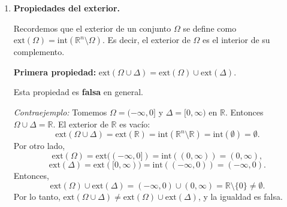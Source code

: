 \documentclass[12pt]{article}
\newcommand{\Ext}{\mathrm{ext}}
\newcommand{\Int}{\mathrm{int}}
\newcommand{\R}{\mathbb R}
\newcommand{\x}{\mathrm x}
\begin{document}
\begin{enumerate}
\begin{enumerate}[(1)]
\textit{Contraejemplo para la otra contención:} Tomemos $\Omega = [0,1]$ y $\Delta = [1,2]$ en $\R$. Entonces $\Omega \cup \Delta = [0,2]$, y tenemos:
\[
\Int(\Omega \cup \Delta) = \Int([0,2]) = (0,2),
\]
mientras que
\[
\Int(\Omega) \cup \Int(\Delta) = \Int([0,1]) \cup \Int([1,2]) = (0,1) \cup (1,2).
\]
Observamos que $1 \in (0,2) = \Int(\Omega \cup \Delta)$, pero $1 \notin (0,1) \cup (1,2) = \Int(\Omega) \cup \Int(\Delta)$. Por lo tanto, $\Int(\Omega \cup \Delta) \not\subseteq \Int(\Omega) \cup \Int(\Delta)$, y la igualdad es falsa.

\textbf{Segunda propiedad:} $\Int(\Omega\cap \Delta) = \Int(\Omega)\cap \Int(\Delta)$.

Esta propiedad es \textbf{verdadera}.

\textit{Demostración:} Probaremos la doble contención.

($\subseteq$) Sea $\x \in \Int(\Omega \cap \Delta)$. Entonces existe $\varepsilon > 0$ tal que $B(\x, \varepsilon) \subseteq \Omega \cap \Delta$. Esto significa que $B(\x, \varepsilon) \subseteq \Omega$ y $B(\x, \varepsilon) \subseteq \Delta$. Por lo tanto, $\x \in \Int(\Omega)$ y $\x \in \Int(\Delta)$, lo que implica que $\x \in \Int(\Omega) \cap \Int(\Delta)$.

($\supseteq$) Sea $\x \in \Int(\Omega) \cap \Int(\Delta)$. Entonces $\x \in \Int(\Omega)$ y $\x \in \Int(\Delta)$. Por lo tanto, existen $\varepsilon_1 > 0$ y $\varepsilon_2 > 0$ tales que $B(\x, \varepsilon_1) \subseteq \Omega$ y $B(\x, \varepsilon_2) \subseteq \Delta$. Sea $\varepsilon = \min\{\varepsilon_1, \varepsilon_2\} > 0$. Entonces $B(\x, \varepsilon) \subseteq B(\x, \varepsilon_1) \subseteq \Omega$ y $B(\x, \varepsilon) \subseteq B(\x, \varepsilon_2) \subseteq \Delta$. Por lo tanto, $B(\x, \varepsilon) \subseteq \Omega \cap \Delta$, lo que implica que $\x \in \Int(\Omega \cap \Delta)$.

Así, $\Int(\Omega\cap \Delta) = \Int(\Omega)\cap \Int(\Delta)$.

\item \textbf{Propiedades del exterior.}

Recordemos que el exterior de un conjunto $\Omega$ se define como $\Ext(\Omega) = \Int(\R^n \setminus \Omega)$. Es decir, el exterior de $\Omega$ es el interior de su complemento.

\textbf{Primera propiedad:} $\Ext(\Omega\cup \Delta) = \Ext(\Omega)\cup \Ext(\Delta)$.

Esta propiedad es \textbf{falsa} en general.

\textit{Contraejemplo:} Tomemos $\Omega = (-\infty, 0]$ y $\Delta = [0, \infty)$ en $\R$. Entonces $\Omega \cup \Delta = \R$. El exterior de $\R$ es vacío:
\[
\Ext(\Omega \cup \Delta) = \Ext(\R) = \Int(\R^n \setminus \R) = \Int(\emptyset) = \emptyset.
\]
Por otro lado,
\[
\Ext(\Omega) = \Ext((-\infty, 0]) = \Int((0, \infty)) = (0, \infty),
\]
\[
\Ext(\Delta) = \Ext([0, \infty)) = \Int((-\infty, 0)) = (-\infty, 0).
\]
Entonces,
\[
\Ext(\Omega) \cup \Ext(\Delta) = (-\infty, 0) \cup (0, \infty) = \R \setminus \{0\} \neq \emptyset.
\]
Por lo tanto, $\Ext(\Omega\cup \Delta) \neq \Ext(\Omega)\cup \Ext(\Delta)$, y la igualdad es falsa.


\end{enumerate}
\end{enumerate}
\end{document}
